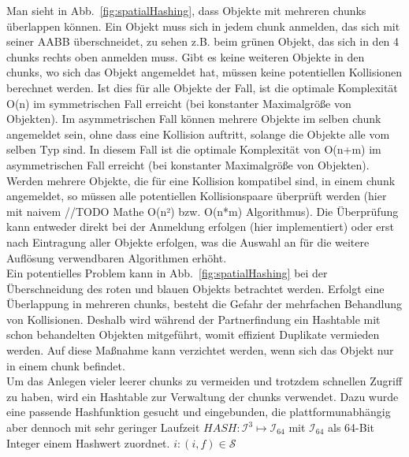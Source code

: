 Man sieht in Abb.~\ref{fig:spatialHashing}, dass Objekte mit mehreren chunks überlappen können. Ein Objekt muss sich in jedem chunk anmelden, das sich mit seiner AABB überschneidet, zu sehen z.B. beim grünen Objekt, das sich in den 4 chunks rechts oben anmelden muss. Gibt es keine weiteren Objekte in den chunks, wo sich das Objekt angemeldet hat, müssen keine potentiellen Kollisionen berechnet werden. Ist dies für alle Objekte der Fall, ist die optimale Komplexität O(n) im symmetrischen Fall erreicht (bei konstanter Maximalgröße von Objekten). Im asymmetrischen Fall können mehrere Objekte im selben chunk angemeldet sein, ohne dass eine Kollision auftritt, solange die Objekte alle vom selben Typ sind. In diesem Fall ist die optimale Komplexität von O(n+m) im asymmetrischen Fall erreicht (bei konstanter Maximalgröße von Objekten). \\
Werden mehrere Objekte, die für eine Kollision kompatibel sind, in einem chunk angemeldet, so müssen alle potentiellen Kollisionspaare überprüft werden (hier mit naivem //TODO Mathe O(n²) bzw. O(n*m) Algorithmus). Die Überprüfung kann entweder direkt bei der Anmeldung erfolgen (hier implementiert) oder erst nach Eintragung aller Objekte erfolgen, was die Auswahl an für die weitere Auflösung verwendbaren Algorithmen erhöht. \\
Ein potentielles Problem kann in Abb.~\ref{fig:spatialHashing} bei der Überschneidung des roten und blauen Objekts betrachtet werden. Erfolgt eine Überlappung in mehreren chunks, besteht die Gefahr der mehrfachen Behandlung von Kollisionen. Deshalb wird während der Partnerfindung ein Hashtable mit schon behandelten Objekten mitgeführt, womit effizient Duplikate vermieden werden. Auf diese Maßnahme kann verzichtet werden, wenn sich das Objekt nur in einem chunk befindet.\\
Um das Anlegen vieler leerer chunks zu vermeiden und trotzdem schnellen Zugriff zu haben, wird ein Hashtable zur Verwaltung der chunks verwendet. Dazu wurde eine passende Hashfunktion gesucht und eingebunden, die plattformunabhängig aber dennoch mit sehr geringer Laufzeit $HASH: \mathcal{I}^3 \mapsto \mathcal{I}_{64}$ mit $\mathcal{I}_{64}$ als 64-Bit Integer einem Hashwert zuordnet. $i: (i, f)\in\mathcal{S}$